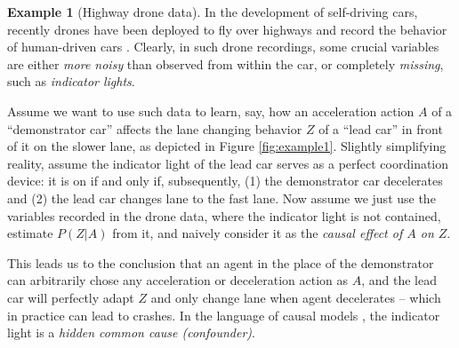 \documentclass[letterpaper]{article} %
\theoremstyle{definition}%
\theoremstyle{definition}
\newtheorem{example}{Example}
\begin{document}
\begin{example}[Highway drone data]
\label{expl:i}
In the development of self-driving cars, recently drones have been deployed to fly over highways and record the behavior of human-driven cars \cite{highDdataset,zhan2019interaction}.
Clearly, in such drone recordings, some crucial variables are either \emph{more noisy} than %
observed from within the car, or completely \emph{missing}, such as \emph{indicator lights}.
%

Assume we want to use such data %
to learn, say, how an acceleration action $A$ of a ``demonstrator car'' affects the lane changing behavior $Z$ of a ``lead car'' in front of it on the slower lane, as depicted in Figure \ref{fig:example1}.
Slightly simplifying reality, assume the indicator light of the lead car serves as a perfect coordination device: it is on if and only if, subsequently, (1) the demonstrator car decelerates and (2) the lead car changes lane to the fast lane.
Now assume we just use the variables recorded in the drone data, where the indicator light is not contained, estimate $P(Z|A)$ from it, and naively consider it as the \emph{causal effect of $A$ on $Z$}. %

This leads us to the conclusion that an agent in the place of the demonstrator can arbitrarily chose any acceleration or deceleration action as $A$, and the lead car will perfectly adapt $Z$ and only change lane when agent decelerates -- which in practice can lead to crashes. In the language of causal models \cite{pearl2009causality,spirtes2000causation}, the indicator light is a \emph{hidden common cause (confounder)}.
\end{example}
\end{document}
